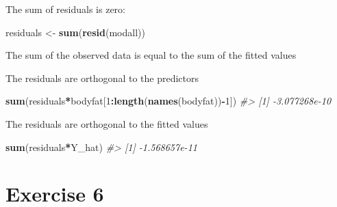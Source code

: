 \documentclass[]{article}
\newenvironment{Shaded}{\begin{snugshade}}{\end{snugshade}}
\newcommand{\CommentTok}[1]{\textcolor[rgb]{0.56,0.35,0.01}{\textit{#1}}}
\newcommand{\DecValTok}[1]{\textcolor[rgb]{0.00,0.00,0.81}{#1}}
\newcommand{\KeywordTok}[1]{\textcolor[rgb]{0.13,0.29,0.53}{\textbf{#1}}}
\newcommand{\NormalTok}[1]{#1}
\newcommand{\OperatorTok}[1]{\textcolor[rgb]{0.81,0.36,0.00}{\textbf{#1}}}
\newcommand{\StringTok}[1]{\textcolor[rgb]{0.31,0.60,0.02}{#1}}
\begin{document}
The sum of residuals is zero:

\begin{Shaded}
\begin{Highlighting}[]
\NormalTok{residuals <-}\StringTok{ }\KeywordTok{sum}\NormalTok{(}\KeywordTok{resid}\NormalTok{(modall))}
\end{Highlighting}
\end{Shaded}

The sum of the observed data is equal to the sum of the fitted values

\begin{Shaded}
\end{Shaded}

The residuals are orthogonal to the predictors

\begin{Shaded}
\begin{Highlighting}[]
\KeywordTok{sum}\NormalTok{(residuals}\OperatorTok{*}\NormalTok{bodyfat[}\DecValTok{1}\OperatorTok{:}\KeywordTok{length}\NormalTok{(}\KeywordTok{names}\NormalTok{(bodyfat))}\OperatorTok{-}\DecValTok{1}\NormalTok{])}
\CommentTok{#> [1] -3.077268e-10}
\end{Highlighting}
\end{Shaded}

The residuals are orthogonal to the fitted values

\begin{Shaded}
\begin{Highlighting}[]
\KeywordTok{sum}\NormalTok{(residuals}\OperatorTok{*}\NormalTok{Y_hat)}
\CommentTok{#> [1] -1.568657e-11}
\end{Highlighting}
\end{Shaded}

\newpage

\hypertarget{exercise-6}{%
\section{Exercise 6}\label{exercise-6}}
\end{document}
